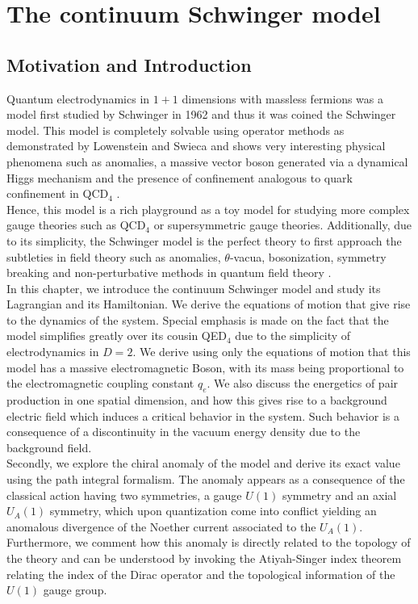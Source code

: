 \chapter{The continuum Schwinger model}\label{ch:SchingerContinuum}




\section{Motivation and Introduction}\label{sec:Motivation1}


Quantum electrodynamics in $1+1$ dimensions with massless fermions was a model first studied by Schwinger in 1962 \cite{Schwinger1962} and thus it was coined the Schwinger model. This model is completely solvable using operator methods as demonstrated by Lowenstein and Swieca \cite{Lowenstein1971} and shows very interesting physical phenomena such as anomalies, a massive vector boson generated via a dynamical Higgs mechanism and the presence of confinement analogous to quark confinement in QCD$_4$ \cite{Bertlman}.\\

Hence, this model is a rich playground as a toy model for studying more complex gauge theories such as QCD$_4$ or supersymmetric gauge theories. Additionally, due to its simplicity, the Schwinger model is the perfect theory to first approach the subtleties in field theory such as anomalies, $\theta$-vacua, bosonization, symmetry breaking and non-perturbative methods in quantum field theory \cite{abdalla, Bertlman}.\\

In this chapter, we introduce the continuum Schwinger model and study its Lagrangian and its Hamiltonian. We derive the equations of motion that give rise to the dynamics of the system. Special emphasis is made on the fact that the model simplifies greatly over its cousin QED$_4$ due to the simplicity of electrodynamics in $D=2$. We derive using only the equations of motion that this model has a massive electromagnetic Boson, with its mass being proportional to the electromagnetic coupling constant $q_e$. We also discuss the energetics of pair production in one spatial dimension, and how this gives rise to a background electric field which induces a critical behavior in the system. Such behavior is a consequence of a discontinuity in the vacuum energy density due to the background field.\\

Secondly, we explore the chiral anomaly of the model and derive its exact value using the path integral formalism. The anomaly appears as a consequence of the classical action having two symmetries, a gauge $U(1)$ symmetry and an axial $U_A(1)$ symmetry, which upon quantization come into conflict yielding an anomalous divergence of the Noether current associated to the $U_A(1)$. Furthermore, we comment how this anomaly is directly related to the topology of the theory and can be understood by invoking the Atiyah-Singer index theorem relating the index of the Dirac operator and the topological information of the $U(1)$ gauge group.\\


